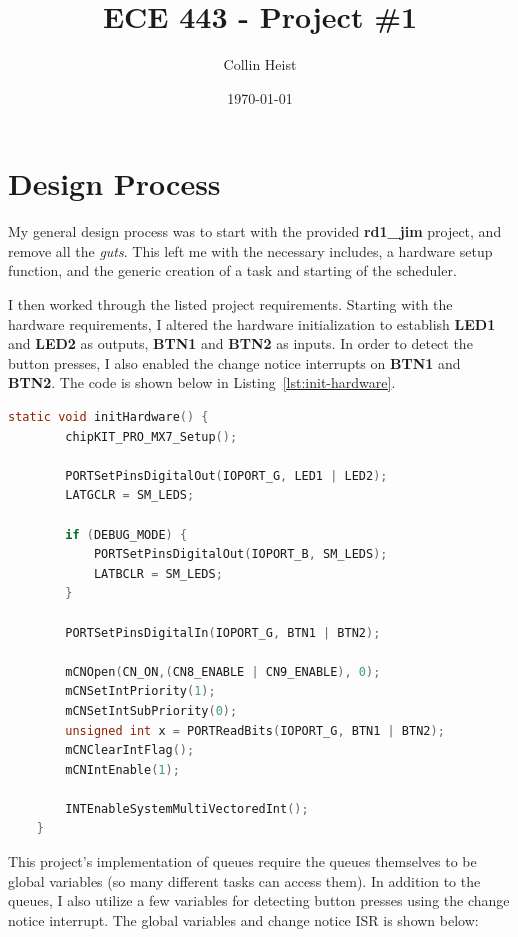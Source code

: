 \documentclass[a4paper, 12pt]{article}
\begin{document}
\title{ECE 443 - Project \#1}
\author{Collin Heist}
\date{\today}
\maketitle
{}
\tableofcontents
\lstlistoflistings
\newpage
{}

\section{Design Process}
My general design process was to start with the provided \textbf{rd1\_jim} project, and remove all the \emph{guts}. This left me with the necessary includes, a hardware setup function, and the generic creation of a task and starting of the scheduler. 

I then worked through the listed project requirements. Starting with the hardware requirements, I altered the hardware initialization to establish \textbf{LED1} and \textbf{LED2} as outputs, \textbf{BTN1} and \textbf{BTN2} as inputs. In order to detect the button presses, I also enabled the change notice interrupts on \textbf{BTN1} and \textbf{BTN2}. The code is shown below in Listing~\ref{lst:init-hardware}.

	\begin{mdframed}[backgroundcolor=code-gray, roundcorner=10pt,
								innerleftmargin=5, innertopmargin=5, innerbottommargin=5]	
	\begin{lstlisting}[language=C, caption=Hardware Initialization, tabsize=2, label={lst:init-hardware}]
	static void initHardware() {
		chipKIT_PRO_MX7_Setup();

		PORTSetPinsDigitalOut(IOPORT_G, LED1 | LED2);
		LATGCLR = SM_LEDS;
	
		if (DEBUG_MODE) { 
			PORTSetPinsDigitalOut(IOPORT_B, SM_LEDS);
			LATBCLR = SM_LEDS;
		}
	
		PORTSetPinsDigitalIn(IOPORT_G, BTN1 | BTN2);
	
		mCNOpen(CN_ON,(CN8_ENABLE | CN9_ENABLE), 0);
		mCNSetIntPriority(1);
		mCNSetIntSubPriority(0);
		unsigned int x = PORTReadBits(IOPORT_G, BTN1 | BTN2);
		mCNClearIntFlag();
		mCNIntEnable(1);

		INTEnableSystemMultiVectoredInt();
	}
	\end{lstlisting}
	\end{mdframed}
	
This project's implementation of queues require the queues themselves to be global variables (so many different tasks can access them). In addition to the queues, I also utilize a few variables for detecting button presses using the change notice interrupt. The global variables and change notice ISR is shown below:
\end{document}
